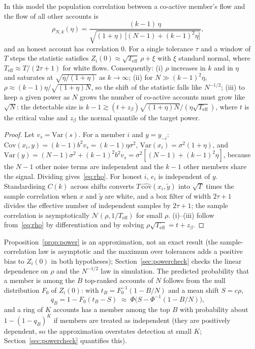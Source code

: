 \begin{proposition}\label{prop:power}
In this model the population correlation between a co-active member's flow and the flow of all other accounts is
\begin{equation}
\rho_{N,k}(\eta)=\frac{(k-1)\,\eta}{\sqrt{(1+\eta)\,\bigl[(N-1)+(k-1)^2\eta\bigr]}},
\label{eq:rho}
\end{equation}
and an honest account has correlation $0$. For a single tolerance $\tau$ and a window of $T$ steps the statistic satisfies $Z_i(0)\approx\sqrt{T_{\mathrm{eff}}}\,\rho+\xi$ with $\xi$ standard normal, where $T_{\mathrm{eff}}\approx T/(2\tau+1)$ for white flows. Consequently: (i) $\rho$ increases in $k$ and in $\eta$ and saturates at $\sqrt{\eta/(1+\eta)}$ as $k\to\infty$; (ii) for $N\gg(k-1)^2\eta$, $\rho\approx(k-1)\eta/\sqrt{(1+\eta)N}$, so the shift of the statistic falls like $N^{-1/2}$; (iii) to keep a given power as $N$ grows the number of co-active accounts must grow like $\sqrt N$: the detectable size is $k-1\gtrsim(t+z_\beta)\sqrt{(1+\eta)N}/(\eta\sqrt{T_{\mathrm{eff}}})$, where $t$ is the critical value and $z_\beta$ the normal quantile of the target power.
\end{proposition}
\begin{proof}
Let $v_s=\mathrm{Var}(s)$. For a member $i$ and $y=y_{-i}$: $\mathrm{Cov}(x_i,y)=(k-1)b^2v_s=(k-1)\eta\sigma^2$, $\mathrm{Var}(x_i)=\sigma^2(1+\eta)$, and $\mathrm{Var}(y)=(N-1)\sigma^2+(k-1)^2b^2v_s=\sigma^2[(N-1)+(k-1)^2\eta]$, because the $N-1$ other noise terms are independent and the $k-1$ other members share the signal. Dividing gives~\eqref{eq:rho}. For honest $i$, $e_i$ is independent of $y$. Standardising $C(k)$ across shifts converts $T\,\widehat{\mathrm{cov}}(x_i,\tilde y)$ into $\sqrt T$ times the sample correlation when $x$ and $\tilde y$ are white, and a box filter of width $2\tau+1$ divides the effective number of independent samples by $2\tau+1$; the sample correlation is asymptotically $\mathcal N(\rho,1/T_{\mathrm{eff}})$ for small $\rho$. (i)--(iii) follow from~\eqref{eq:rho} by differentiation and by solving $\rho\sqrt{T_{\mathrm{eff}}}=t+z_\beta$. \qedhere
\end{proof}

Proposition~\ref{prop:power} is an approximation, not an exact result (the sample-correlation law is asymptotic and the maximum over tolerances adds a positive bias to $Z_i(0)$ in both hypotheses); Section~\ref{sec:powercheck} checks the linear dependence on $\rho$ and the $N^{-1/2}$ law in simulation. The predicted probability that a member is among the $B$ top-ranked accounts of $N$ follows from the null distribution $F_0$ of $Z_i(0)$: with $t_B=F_0^{-1}(1-B/N)$ and a mean shift $S=c\rho$,
\begin{equation}
q_B=1-F_0(t_B-S)\;\approx\;\Phi\!\bigl(S-\Phi^{-1}(1-B/N)\bigr),
\label{eq:qB}
\end{equation}
and a ring of $K$ accounts has a member among the top $B$ with probability about $1-(1-q_B)^K$ if members are treated as independent (they are positively dependent, so the approximation overstates detection at small $K$; Section~\ref{sec:powercheck} quantifies this).

